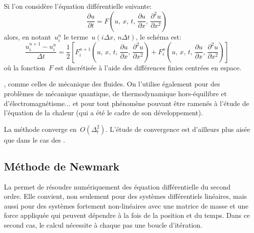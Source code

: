 \medskip
Si l'on considère l'équation différentielle suivante:
\begin{equation}
  \frac{\partial u}{\partial t} = F\left(u,\, x,\, t,\, \frac{\partial u}{\partial x},\, \frac{\partial^2 u}{\partial x^2}\right)
\end{equation}
alors, en notant~$u_{i}^{n}$ le terme~$u(i \Delta x,\, n \Delta t)$, le schéma est:
\begin{equation}
  \frac{u_{i}^{n + 1} - u_{i}^{n}}{\Delta t} = \frac{1}{2}\left[ F_{i}^{n + 1}\left(u,\, x,\, t,\, \frac{\partial u}{\partial x},\, \frac{\partial^2 u}{\partial x^2}\right) + F_{i}^{n}\left(u,\, x,\, t,\, \frac{\partial u}{\partial x},\, \frac{\partial^2 u}{\partial x^2}\right) \right]
\end{equation}
où la fonction~$F$ est discrétisée à l'aide des différences finies centrées en espace.

\medskip
{}, comme celles de mécanique des fluides.
On l'utilise également pour des problèmes de mécanique quantique, de thermodynamique hors-équilibre
et d'électromagnétisme... et pour tout phénomène pouvant être ramenés à l'étude de l'équation de la chaleur
(qui a été le cadre de son développement).

\medskip
La méthode converge en~$O(\Delta_t^2)$.
L'étude de convergence est d'ailleurs plus aisée que dans le cas des .

\medskip
\subsection{Méthode de Newmark}\label{Sec-Newmark} 

La  permet de résoudre numériquement des équation différentielle du second ordre. Elle convient, non seulement pour des systèmes différentiels linéaires, mais aussi pour des systèmes fortement non-linéaires avec une matrice de masse et une force appliquée qui peuvent dépendre à la fois de la position et du temps. Dans ce second cas, le calcul nécessite à chaque pas une boucle d'itération. 

